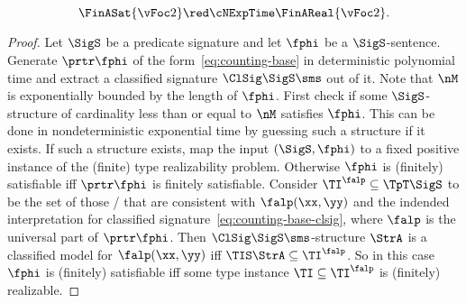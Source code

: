 \begin{remark}
\[
\FinASat{\vFoc2} \red\cNExpTime \FinAReal{\vFoc2}.
\]
\end{remark}
\begin{proof}
Let $\SigS$ be a predicate signature and let $\fphi$ be a $\SigS$-sentence.
Generate $\prtr\fphi$ of the form~\cref{eq:counting-base} in deterministic
polynomial time and extract a classified signature $\ClSig\SigS\sms$ out of it.
Note that $\nM$ is exponentially bounded by the length of $\fphi$.
First check if some $\SigS$-structure of cardinality less than or equal to $\nM$
satisfies $\fphi$. This can be done in nondeterministic exponential time by
guessing such a structure if it exists.
If such a structure exists, map the input $(\SigS,\fphi)$ to a fixed positive
instance of the (finite) type realizability problem.
Otherwise $\fphi$ is (finitely) satisfiable iff $\prtr\fphi$ is finitely
satisfiable.
Consider $\TI^\falp \subseteq \TpT\SigS$ to be the set of those \twotypes/ that
are consistent with $\falp(\xx,\yy)$ and the indended interpretation for
classified signature~\cref{eq:counting-base-clsig}, where $\falp$ is the
universal part of $\prtr\fphi$.
Then $\ClSig\SigS\sms$-structure $\StrA$ is a classified model for
$\falp(\xx,\yy)$ iff $\TIS\StrA \subseteq \TI^\falp$.
So in this case $\fphi$ is (finitely) satisfiable iff some
type instance $\TI\subseteq\TI^\falp$ is (finitely) realizable.
\end{proof}

